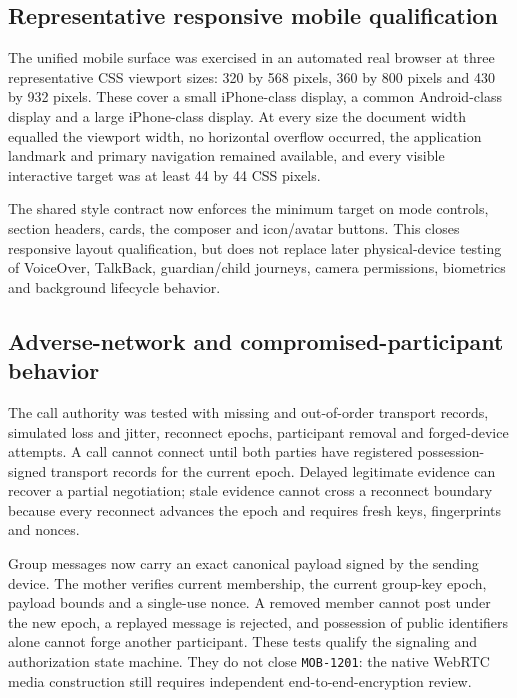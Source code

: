 \subsection{Representative responsive mobile qualification}

The unified mobile surface was exercised in an automated real browser at three
representative CSS viewport sizes: 320 by 568 pixels, 360 by 800 pixels and 430 by
932 pixels.  These cover a small iPhone-class display, a common Android-class
display and a large iPhone-class display.  At every size the document width equalled
the viewport width, no horizontal overflow occurred, the application landmark and
primary navigation remained available, and every visible interactive target was at
least 44 by 44 CSS pixels.

The shared style contract now enforces the minimum target on mode controls, section
headers, cards, the composer and icon/avatar buttons.  This closes responsive layout
qualification, but does not replace later physical-device testing of VoiceOver,
TalkBack, guardian/child journeys, camera permissions, biometrics and background
lifecycle behavior.

\subsection{Adverse-network and compromised-participant behavior}

The call authority was tested with missing and out-of-order transport records,
simulated loss and jitter, reconnect epochs, participant removal and forged-device
attempts.  A call cannot connect until both parties have registered possession-signed
transport records for the current epoch.  Delayed legitimate evidence can recover a
partial negotiation; stale evidence cannot cross a reconnect boundary because every
reconnect advances the epoch and requires fresh keys, fingerprints and nonces.

Group messages now carry an exact canonical payload signed by the sending device.
The mother verifies current membership, the current group-key epoch, payload bounds
and a single-use nonce.  A removed member cannot post under the new epoch, a replayed
message is rejected, and possession of public identifiers alone cannot forge another
participant.  These tests qualify the signaling and authorization state machine.
They do not close \texttt{MOB-1201}: the native WebRTC media construction still
requires independent end-to-end-encryption review.

